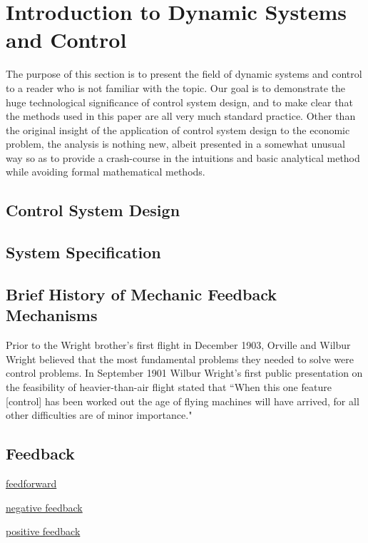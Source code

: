 \section{Introduction to Dynamic Systems and Control}
\label{section:dynamic_systems_and_control}

The purpose of this section is to present the field of dynamic systems and control to a reader who
is not familiar with the topic. Our goal is to demonstrate the huge technological significance of
control system design, and to make clear that the methods used in this paper are all very much
standard practice. Other than the original insight of the application of control system design to
the economic problem, the analysis is nothing new, albeit presented in a somewhat unusual way so as
to provide a crash-course in the intuitions and basic analytical method while avoiding formal
mathematical methods.

\subsection{Control System Design}

\subsection{System Specification}
\label{section:system_specification}

\subsection{Brief History of Mechanic Feedback Mechanisms}

Prior to the Wright brother's first flight in December 1903, Orville and Wilbur Wright believed that
the most fundamental problems they needed to solve were control problems. In September 1901 Wilbur
Wright's first public presentation on the feasibility of heavier-than-air flight stated that ``When
this one feature [control] has been worked out the age of flying machines will have arrived, for all
other difficulties are of minor importance."\cite{wright1908}

\subsection{Feedback}

\underline{feedforward}

\underline{negative feedback}

\underline{positive feedback}

